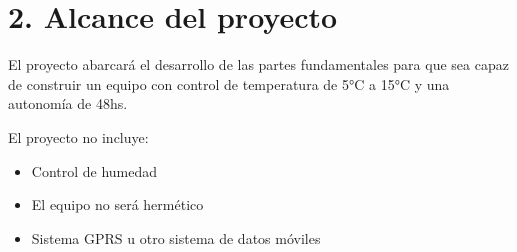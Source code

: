 \section{2. Alcance del proyecto}
\label{sec:alcance}

\quad El proyecto abarcará el desarrollo de las partes fundamentales para que sea capaz de construir un equipo con control de temperatura de 5°C a 15°C y una autonomía de 48hs.

El proyecto no incluye:
\begin{itemize}
  \item Control de humedad
  \item El equipo no será hermético
  \item Sistema GPRS u otro sistema de datos móviles
\end{itemize}